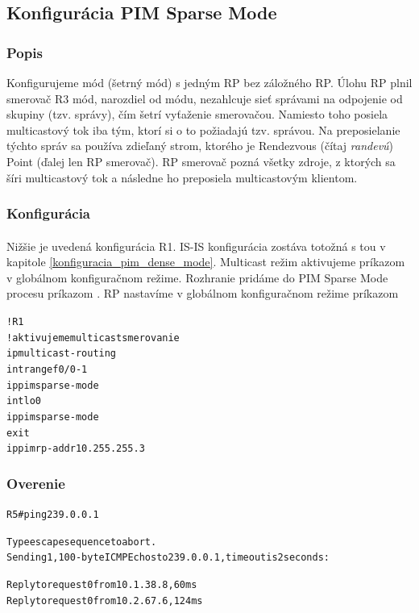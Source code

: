 \documentclass[12pt,twoside,a4paper]{report}
\begin{document}
\subsection{Konfigurácia PIM Sparse Mode}
\subsubsection{Popis}
Konfigurujeme  mód (šetrný mód) s jedným RP bez záložného RP. Úlohu RP plnil smerovač R3  mód, narozdiel od  módu, nezahlcuje sieť správami na odpojenie od skupiny (tzv.  správy), čím šetrí vyťaženie smerovačou. Namiesto toho posiela multicastový tok iba tým, ktorí si o to požiadajú tzv.  správou. Na preposielanie týchto správ sa používa zdieľaný strom, ktorého  je Rendezvous (čítaj \textit{randevú}) Point (ďalej len RP smerovač). RP smerovač pozná všetky zdroje, z ktorých sa šíri  multicastový tok a následne ho preposiela multicastovým klientom.

\subsubsection{Konfigurácia}
\paragraph{}
Nižšie je uvedená konfigurácia R1. IS-IS konfigurácia zostáva totožná s tou v kapitole \ref{konfiguracia_pim_dense_mode}. Multicast režim aktivujeme príkazom  v globálnom konfiguračnom režime. Rozhranie pridáme do PIM Sparse Mode procesu príkazom . RP nastavíme v globálnom konfiguračnom režime príkazom 

\noindent
{\selectfont
\begin{small}
\begin{alltt}
!R1
!aktivujeme multicast smerovanie
ip multicast-routing
int range f0/0 - 1
  ip pim sparse-mode
int lo0
  ip pim sparse-mode
  exit
ip pim rp-addr 10.255.255.3
\end{alltt}
\end{small}
}


\subsubsection{Overenie}

\noindent
{\selectfont
\begin{small}
\begin{alltt}
R5#ping 239.0.0.1

Type escape sequence to abort.
Sending 1, 100-byte ICMP Echos to 239.0.0.1, timeout is 2 seconds:

Reply to request 0 from 10.1.38.8, 60 ms
Reply to request 0 from 10.2.67.6, 124 ms
\end{alltt}
\end{small}
}
\end{document}
